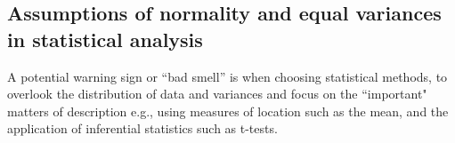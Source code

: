 \documentclass[preprint,10pt]{elsarticle}
\begin{document}




\subsection{Assumptions of normality and equal variances in statistical analysis}

A potential warning sign or ``bad smell'' is when choosing statistical methods, to overlook the distribution of data and variances and focus on the ``important" matters of description e.g., using measures of location such as the mean, and the application of inferential statistics such as t-tests.
\end{document}
